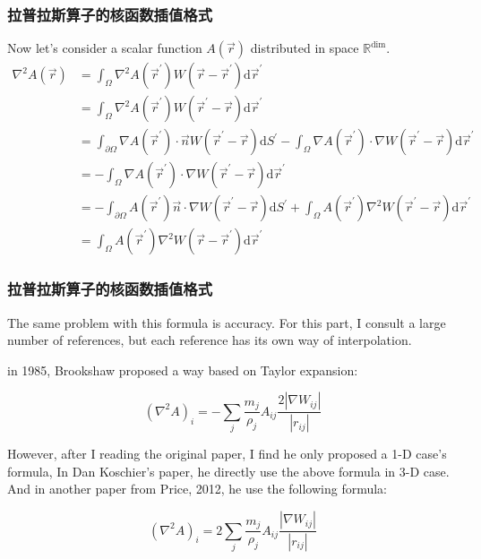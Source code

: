 \begin{frame}
    \frametitle{拉普拉斯算子的核函数插值格式}
    Now let's consider a scalar function $A(\vec{r})$ distributed in space $\mathbb{R}^\text{dim}$.
\begin{equation}
    \begin{aligned}
        \nabla^2 A(\vec{r}) &= \int_{\Omega} \nabla^2 A(\vec{r}^\prime) W(\vec{r} - \vec{r}^\prime) \mathrm{d}\vec{r}^\prime \\
        &= \int_{\Omega} \nabla^2 A(\vec{r}^\prime) W(\vec{r}^\prime - \vec{r}) \mathrm{d}\vec{r}^\prime \\
        &= \int_{\partial \Omega} \nabla A(\vec{r}^\prime) \cdot \vec{n} W(\vec{r}^\prime - \vec{r}) \mathrm{d}S^\prime -
        \int_{\Omega} \nabla A(\vec{r}^\prime) \cdot \nabla W(\vec{r}^\prime - \vec{r}) \mathrm{d}\vec{r}^\prime\\
        &= -\int_{\Omega} \nabla A(\vec{r}^\prime) \cdot \nabla W(\vec{r}^\prime - \vec{r}) \mathrm{d}\vec{r}^\prime\\
        &= -\int_{\partial \Omega} A(\vec{r}^\prime)\vec{n} \cdot \nabla W(\vec{r}^\prime - \vec{r}) \mathrm{d}S^\prime +
        \int_{\Omega} A(\vec{r}^\prime) \nabla^2 W(\vec{r}^\prime - \vec{r}) \mathrm{d}\vec{r}^\prime\\
        &= \int_{\Omega} A(\vec{r}^\prime) \nabla^2 W(\vec{r} - \vec{r}^\prime) \mathrm{d}\vec{r}^\prime
    \end{aligned}
\end{equation}
\end{frame}

\begin{frame}
    \frametitle{拉普拉斯算子的核函数插值格式}
    The same problem with this formula is accuracy. 
For this part, 
I consult a large number of references, 
but each reference has its own way of interpolation.

in 1985, Brookshaw proposed a way based on Taylor expansion:

\begin{equation}
    (\nabla^2 A)_i = -\sum_{j} \frac{m_j}{\rho_j} A_{ij}\frac{2|\nabla W_{ij}|}{|r_{ij}|}
\end{equation}

However, after I reading the original paper, I find he only proposed a 1-D case's formula, 
In Dan Koschier's paper, he directly use the above formula in 3-D case. 
And in another paper from Price, 2012, he use the following formula:

\begin{equation}
    (\nabla^2 A)_i = 2\sum_{j} \frac{m_j}{\rho_j} A_{ij}\frac{|\nabla W_{ij}|}{|r_{ij}|}
\end{equation}
\end{frame}

